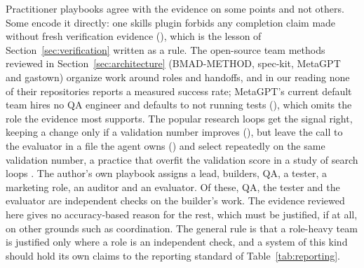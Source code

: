 Practitioner playbooks agree with the evidence on some points and not others. Some encode it directly: one skills plugin forbids any completion claim made without fresh verification evidence (), which is the lesson of Section~\ref{sec:verification} written as a rule. The open-source team methods reviewed in Section~\ref{sec:architecture} (BMAD-METHOD, spec-kit, MetaGPT and gastown) organize work around roles and handoffs, and in our reading none of their repositories reports a measured success rate; MetaGPT's current default team hires no QA engineer and defaults to not running tests (), which omits the role the evidence most supports. The popular research loops get the signal right, keeping a change only if a validation number improves (), but leave the call to the evaluator in a file the agent owns () and select repeatedly on the same validation number, a practice that overfit the validation score in a study of search loops \citep{R26}. The author's own playbook assigns a lead, builders, QA, a tester, a marketing role, an auditor and an evaluator. Of these, QA, the tester and the evaluator are independent checks on the builder's work. The evidence reviewed here gives no accuracy-based reason for the rest, which must be justified, if at all, on other grounds such as coordination. The general rule is that a role-heavy team is justified only where a role is an independent check, and a system of this kind should hold its own claims to the reporting standard of Table~\ref{tab:reporting}.
